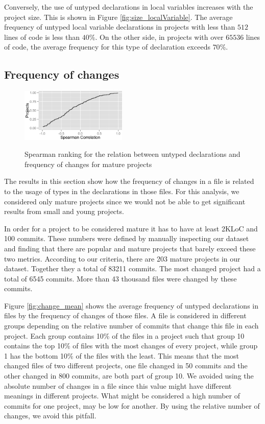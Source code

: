 \documentclass[preprint]{sigplanconf}
\begin{document}
Conversely, the use of untyped declarations in local variables increases with the project size. 
This is shown in Figure \ref{fig:size_localVariable}. 
The average frequency of untyped local variable declarations in projects with less than $512$ lines of code is less than $40\%$. 
On the other side, in projects with over $65536$ lines of code, the average frequency for this type of declaration exceeds $70\%$.



\subsection{Frequency of changes\label{res-changes}}

\begin{figure}[hb]
\centering \includegraphics[width=0.45\textwidth]{../analysis/result/change_commits_distribution.png} 
\label{fig:change_spearman} 
\caption{Spearman ranking for the relation between untyped declarations and frequency of changes for mature projects}
\end{figure}


The results in this section show how the frequency of changes in a file is related to the usage of types in the declarations in those files.
For this analysis, we considered only mature projects since we would not be able to get significant results from small and young projects.

In order for a project to be considered mature it has to have at least 2KLoC and 100 commits.
These numbers were defined by manually inspecting our dataset and finding that there are popular and mature projects that barely exceed these two metrics.
According to our criteria, there are 203 mature projects in our dataset.
Together they a total of 83211 commits. 
The most changed project had a total of 6545 commits.
More than 43 thousand files were changed by these commits.

Figure \ref{fig:change_mean} shows the average frequency of untyped declarations in files by the frequency of changes of those files.
A file is considered in different groups depending on the relative number of commits that change this file in each project.
Each group contains 10\% of the files in a project such that group 10 contains the top 10\% of files with the most changes of every project, while group 1 has the bottom 10\% of the files with the least.
This means that the most changed files of two different projects, one file changed in 50 commits and the other changed in 800 commits, are both part of group 10.
We avoided using the absolute number of changes in a file since this value might have different meanings in different projects.
What might be considered a high number of commits for one project, may be low for another.
By using the relative number of changes, we avoid this pitfall.
\end{document}
